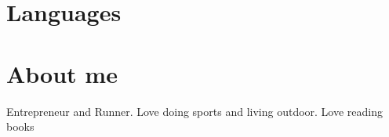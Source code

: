 \documentclass[11pt,a4paper,sans]{moderncv}        %
\begin{document}
\section{Languages}

\section{About me}
Entrepreneur and Runner. Love doing sports and living outdoor. Love reading books

\vspace{1mm}

\end{document}
